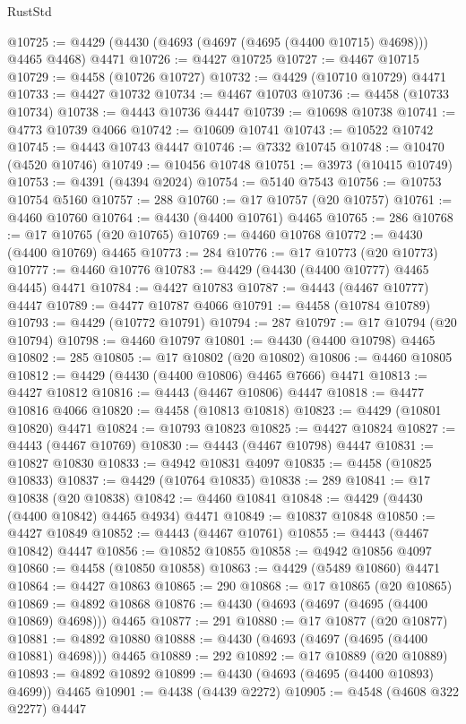 \begin{lexlean}{RustStd}
\begin{coremodule}
@10725 := @4429 (@4430 (@4693 (@4697 (@4695 (@4400 @10715) @4698))) @4465 @4468) @4471
@10726 := @4427 @10725
@10727 := @4467 @10715
@10729 := @4458 (@10726 @10727)
@10732 := @4429 (@10710 @10729) @4471
@10733 := @4427 @10732
@10734 := @4467 @10703
@10736 := @4458 (@10733 @10734)
@10738 := @4443 @10736 @4447
@10739 := @10698 @10738
@10741 := @4773 @10739 @4066
@10742 := @10609 @10741
@10743 := @10522 @10742
@10745 := @4443 @10743 @4447
@10746 := @7332 @10745
@10748 := @10470 (@4520 @10746)
@10749 := @10456 @10748
@10751 := @3973 (@10415 @10749)
@10753 := @4391 (@4394 @2024)
@10754 := @5140 @7543
@10756 := @10753 @10754 @5160
@10757 := 288
@10760 := @17 @10757 (@20 @10757)
@10761 := @4460 @10760
@10764 := @4430 (@4400 @10761) @4465
@10765 := 286
@10768 := @17 @10765 (@20 @10765)
@10769 := @4460 @10768
@10772 := @4430 (@4400 @10769) @4465
@10773 := 284
@10776 := @17 @10773 (@20 @10773)
@10777 := @4460 @10776
@10783 := @4429 (@4430 (@4400 @10777) @4465 @4445) @4471
@10784 := @4427 @10783
@10787 := @4443 (@4467 @10777) @4447
@10789 := @4477 @10787 @4066
@10791 := @4458 (@10784 @10789)
@10793 := @4429 (@10772 @10791)
@10794 := 287
@10797 := @17 @10794 (@20 @10794)
@10798 := @4460 @10797
@10801 := @4430 (@4400 @10798) @4465
@10802 := 285
@10805 := @17 @10802 (@20 @10802)
@10806 := @4460 @10805
@10812 := @4429 (@4430 (@4400 @10806) @4465 @7666) @4471
@10813 := @4427 @10812
@10816 := @4443 (@4467 @10806) @4447
@10818 := @4477 @10816 @4066
@10820 := @4458 (@10813 @10818)
@10823 := @4429 (@10801 @10820) @4471
@10824 := @10793 @10823
@10825 := @4427 @10824
@10827 := @4443 (@4467 @10769)
@10830 := @4443 (@4467 @10798) @4447
@10831 := @10827 @10830
@10833 := @4942 @10831 @4097
@10835 := @4458 (@10825 @10833)
@10837 := @4429 (@10764 @10835)
@10838 := 289
@10841 := @17 @10838 (@20 @10838)
@10842 := @4460 @10841
@10848 := @4429 (@4430 (@4400 @10842) @4465 @4934) @4471
@10849 := @10837 @10848
@10850 := @4427 @10849
@10852 := @4443 (@4467 @10761)
@10855 := @4443 (@4467 @10842) @4447
@10856 := @10852 @10855
@10858 := @4942 @10856 @4097
@10860 := @4458 (@10850 @10858)
@10863 := @4429 (@5489 @10860) @4471
@10864 := @4427 @10863
@10865 := 290
@10868 := @17 @10865 (@20 @10865)
@10869 := @4892 @10868
@10876 := @4430 (@4693 (@4697 (@4695 (@4400 @10869) @4698))) @4465
@10877 := 291
@10880 := @17 @10877 (@20 @10877)
@10881 := @4892 @10880
@10888 := @4430 (@4693 (@4697 (@4695 (@4400 @10881) @4698))) @4465
@10889 := 292
@10892 := @17 @10889 (@20 @10889)
@10893 := @4892 @10892
@10899 := @4430 (@4693 (@4695 (@4400 @10893) @4699)) @4465
@10901 := @4438 (@4439 @2272)
@10905 := @4548 (@4608 @322 @2277) @4447

\end{coremodule}
\end{lexlean}
